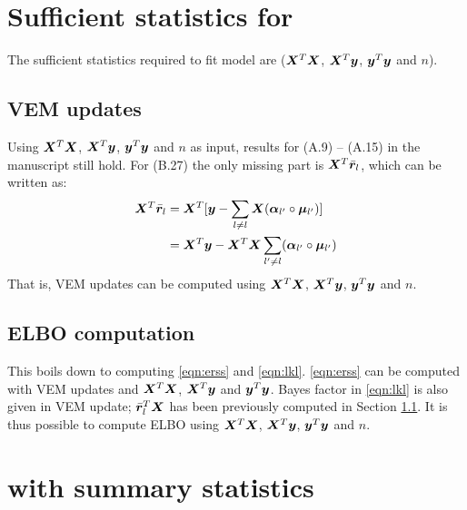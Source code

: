 \section{Sufficient statistics for \susie}

The sufficient statistics required to fit \susie model are ($\bm X^T\bm X$, $\bm X^T\bm y$, $\bm y^{T}\bm y$ and $n$).

\subsection{VEM updates} \label{sec:vem_update_ss}
Using $\bm X^T\bm X$, $\bm X^T\bm y$, $\bm y^{T}\bm y$ and $n$ as input, results for (A.9) -- (A.15) in the manuscript still hold. For (B.27) the only missing part is $\bm X^T\bar{\bm r}_l$, which can be written as:
\begin{align}
\bm X^T\bar{\bm r}_l &= \bm X^T[\bm y - \sum_{l\neq l}\bm X (\bm \alpha_{l'} \circ \bm \mu_{l'})] \\
&= \bm X^T\bm y - \bm X^T\bm X\sum_{l'\neq l}(\bm \alpha_{l'} \circ \bm \mu_{l'})
\end{align}
That is, VEM updates can be computed using $\bm X^T\bm X$, $\bm X^T\bm y$, $\bm y^{T}\bm y$ and $n$.

\subsection{ELBO computation} \label{sec:elbo_ss}
This boils down to computing \eqref{eqn:erss} and \eqref{eqn:lkl}. \eqref{eqn:erss} can be computed with VEM updates and $\bm X^T\bm X$, $\bm X^T\bm y$ and $\bm y^{T}\bm y$. Bayes factor in \eqref{eqn:lkl} is also given in VEM update; $\bar{\bm r}_l^T\bm X$ has been previously computed in Section \ref{sec:vem_update_ss}. It is thus possible to compute ELBO using $\bm X^T\bm X$, $\bm X^T\bm y$, $\bm y^{T}\bm y$ and $n$.

\section{\susie with summary statistics}

